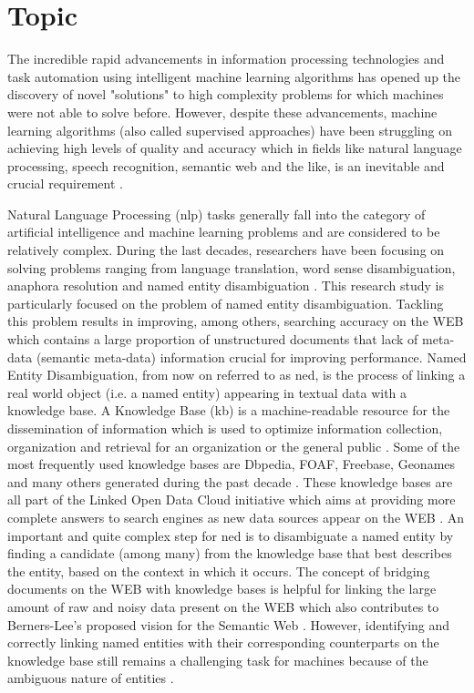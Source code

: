 \section{Topic}
The incredible rapid advancements in information processing technologies and task automation using intelligent machine learning algorithms has opened up the discovery of novel "solutions" to high complexity problems for which machines were not able to solve before. However, despite these advancements, machine learning algorithms (also called supervised approaches) have been struggling on achieving high levels of quality and accuracy which in fields like natural language processing, speech recognition, semantic web and the like, is an inevitable and crucial requirement \cite{30}.

Natural Language Processing (\ac{nlp}) tasks generally fall into the category of artificial intelligence and machine learning problems and are considered to be relatively complex\cite{30, 12}. During the last decades, researchers have been focusing on solving problems ranging from language translation, word sense disambiguation, anaphora resolution and named entity disambiguation \cite{1,8,12,20,30}. This research study is particularly focused on the problem of named entity disambiguation. Tackling this problem results in improving, among others, searching accuracy on the WEB which contains a large proportion of unstructured documents that lack of meta-data (semantic meta-data) information crucial for improving performance\cite{semantic_search}. Named Entity Disambiguation, from now on referred to as \ac{ned}, is the process of linking a real world object (i.e. a named entity) appearing in textual data with a knowledge base. A Knowledge Base (\ac{kb}) is a machine-readable resource for the dissemination of information which is used to optimize information collection, organization and retrieval for an organization or the general public \cite{dbpedia}. Some of the most frequently used knowledge bases are Dbpedia, FOAF, Freebase, Geonames and many others generated during the past decade \cite{lod_sofar}. These knowledge bases are all part of the Linked Open Data Cloud initiative which aims at providing more complete answers to search engines as new data sources appear on the WEB \cite{lod_sofar}. An important and quite complex step for \ac{ned} is to disambiguate a named entity by finding a candidate (among many) from the knowledge base that best describes the entity, based on the context in which it occurs. The concept of bridging documents on the WEB with knowledge bases is helpful for linking the large amount of raw and noisy data present on the WEB which also contributes to Berners-Lee's proposed vision for the Semantic Web \cite{12}. However, identifying and correctly linking named entities with their corresponding counterparts on the knowledge base still remains a challenging task for machines because of the ambiguous nature of entities \cite{2}. 

